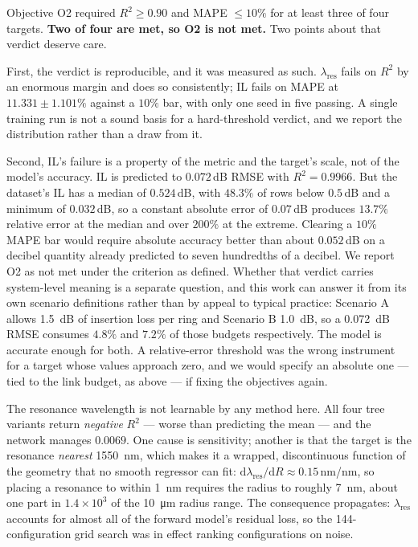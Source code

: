 \documentclass[11pt]{article}
\newcommand{\lres}{\lambda_{\mathrm{res}}}
\begin{document}
Objective O2 required $R^2 \ge 0.90$ and MAPE $\le 10\%$ for at least three of
four targets. \textbf{Two of four are met, so O2 is not met.} Two points
about that verdict deserve care.

First, the verdict is reproducible, and it was measured as such. $\lres$ fails
on $R^2$ by an enormous margin and does so consistently; IL fails on MAPE at
$11.331 \pm 1.101\%$ against a $10\%$ bar, with only one seed in five passing.
A single training run is not a sound basis for a hard-threshold verdict, and
we report the distribution rather than a draw from it.

Second, IL's failure is a property of the metric and the target's scale, not of
the model's accuracy. IL is predicted to $0.072$\,dB RMSE with
$R^2 = 0.9966$. But the dataset's IL has a median of $0.524$\,dB, with
$48.3\%$ of rows below $0.5$\,dB and a minimum of $0.032$\,dB, so a constant
absolute error of $0.07$\,dB produces $13.7\%$ relative error at the median
and over $200\%$ at the extreme. Clearing a $10\%$ MAPE bar would require
absolute accuracy better than about $0.052$\,dB on a decibel quantity already
predicted to seven hundredths of a decibel. We report O2 as not met under the
criterion as defined. Whether that verdict carries system-level meaning is a
separate question, and this work can answer it from its own scenario
definitions rather than by appeal to typical practice: Scenario A allows
\SI{1.5}{dB} of insertion loss per ring and Scenario B \SI{1.0}{dB}, so a
\SI{0.072}{dB} RMSE consumes $4.8\%$ and $7.2\%$ of those budgets
respectively. The model is accurate enough for both. A relative-error
threshold was the wrong instrument for a target whose values approach zero,
and we would specify an absolute one --- tied to the link budget, as above
--- if fixing the objectives again.

The resonance wavelength is not learnable by any method here. All four tree
variants return \emph{negative} $R^2$ --- worse than predicting the mean ---
and the network manages $0.0069$. One cause is sensitivity; another is that the target is the resonance \emph{nearest} \SI{1550}{nm}, which makes it a wrapped, discontinuous function of the geometry that no smooth regressor can fit:
$\mathrm{d}\lres/\mathrm{d}R \approx 0.15$\,nm/nm, so placing a resonance to
within \SI{1}{nm} requires the radius to roughly \SI{7}{nm}, about one part in $1.4\times10^3$ of the \SI{10}{\micro\metre} radius range. The consequence propagates: $\lres$ accounts for
almost all of the forward model's residual loss, so the 144-configuration grid
search was in effect ranking configurations on noise.
\end{document}
